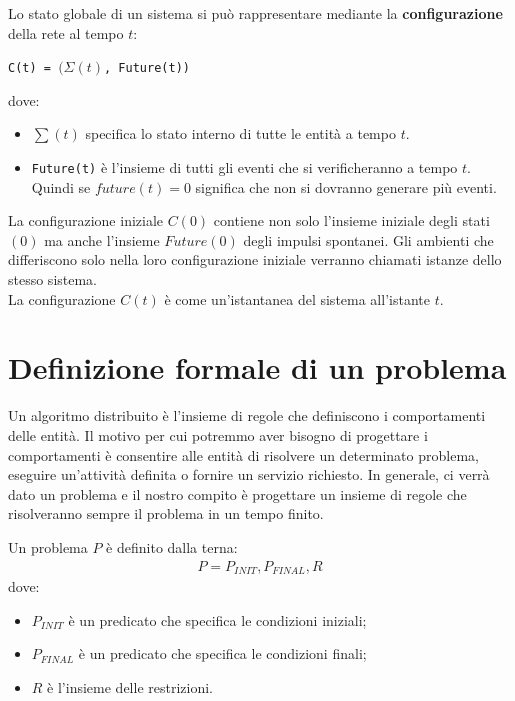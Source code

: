 Lo stato globale di un sistema si può rappresentare mediante la
\textbf{configurazione} della rete al tempo $t$:

\begin{center}
    \texttt{C(t) = $(\Sigma(t)$, \texttt{Future(t)})}
\end{center}

dove:

\begin{itemize}
    \item $\sum(t)$ specifica lo stato interno di tutte le entità a tempo $t$.
    \item \texttt{Future(t)} è l'insieme di tutti gli eventi che si verificheranno
          a tempo $t$. Quindi se $future(t) = 0$ significa che non si dovranno generare
          più eventi.
\end{itemize}

La configurazione iniziale $C(0)$ contiene non solo l'insieme iniziale degli
stati $(0)$ ma anche l'insieme $Future(0)$ degli impulsi spontanei. Gli ambienti
che differiscono solo nella loro configurazione iniziale verranno chiamati
istanze dello stesso sistema.\\
La configurazione $C(t)$ è come un'istantanea del sistema all'istante $t$.


\section{Definizione formale di un problema}
Un algoritmo distribuito è l'insieme di regole che definiscono i comportamenti
delle entità. Il motivo per cui potremmo aver bisogno di progettare i
comportamenti è consentire alle entità di risolvere un determinato problema,
eseguire un'attività definita o fornire un servizio richiesto. In generale, ci
verrà dato un problema e il nostro compito è progettare un insieme di regole che
risolveranno sempre il problema in un tempo finito.

\begin{definition}
    Un problema $P$ è definito dalla terna:
    \begin{eqnarray}
        P = P_{INIT}, P_{FINAL}, R
        \nonumber
    \end{eqnarray}
    dove:
    \begin{itemize}
        \item $P_{INIT}$ è un predicato che specifica le condizioni iniziali;
        \item $P_{FINAL}$ è un predicato che specifica le condizioni finali;
        \item $R$ è l'insieme delle restrizioni. \end{itemize}
\end{definition}

